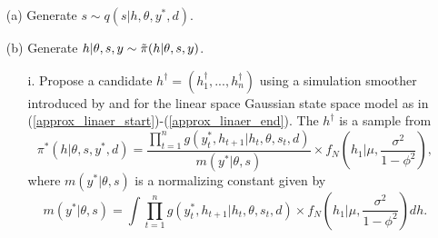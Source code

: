 \begin{itemize}
    \item[(a)] Generate $s \sim q(s|h, \theta, y^*, d)$.
    
    \item[(b)] Generate $h|\theta, s, y \sim \Tilde{\pi}(h|\theta, s, y)$.
    
    \begin{itemize}
        \item[i.] Propose a candidate $h^\dag = (h_1^\dag, ..., h_n^\dag)$ using a simulation smoother introduced by \cite{DeShephard(95)} and \cite{DurbinKoopman(02)} for the linear space Gaussian state space model as in (\ref{approx_linaer_start})-(\ref{approx_linaer_end}).
        The $h^\dag$ is a sample from
        \begin{equation*}
            \pi^*(h|\theta, s, y^*, d) = \frac{\prod_{t=1}^n g(y_t^*, h_{t+1}| h_t, \theta, s_t, d)}{m(y^*|\theta, s)} \times f_N \left( h_1 \bigg| \mu, \frac{\sigma^2}{1-\phi^2} \right),
        \end{equation*}
        where $m(y^*|\theta, s)$ is a normalizing constant given by 
        \begin{equation*}
            m(y^*|\theta, s) = \int \prod_{t=1}^n g(y_t^*, h_{t+1}| h_t, \theta, s_t, d) \times f_N \left( h_1 \bigg| \mu, \frac{\sigma^2}{1-\phi^2} \right) dh.
        \end{equation*}


\end{itemize}
\end{itemize}
